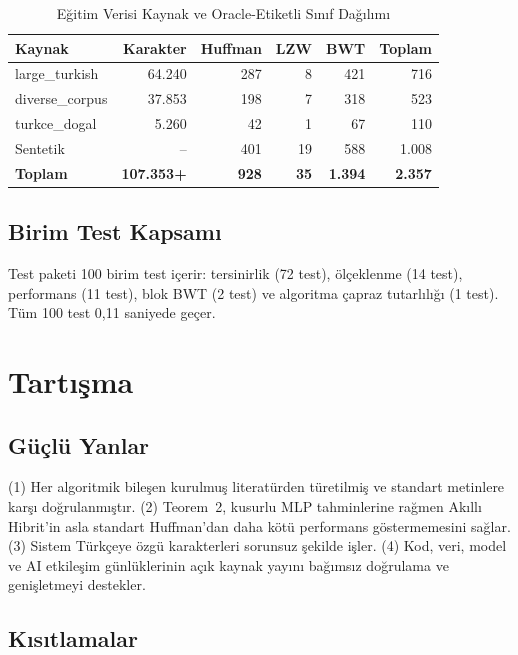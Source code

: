 \documentclass[conference]{IEEEtran}
\begin{document}
\begin{table}[h]
\caption{Eğitim Verisi Kaynak ve Oracle-Etiketli Sınıf Dağılımı}
\label{tab:dataset}
\centering
\small
\begin{tabular}{@{}lrrrrr@{}}
\toprule
Kaynak & Karakter & Huffman & LZW & BWT & Toplam \\
\midrule
large\_turkish & 64.240 & 287 & 8 & 421 & 716 \\
diverse\_corpus & 37.853 & 198 & 7 & 318 & 523 \\
turkce\_dogal & 5.260 & 42 & 1 & 67 & 110 \\
Sentetik & -- & 401 & 19 & 588 & 1.008 \\
\midrule
\textbf{Toplam} & \textbf{107.353+} & \textbf{928} & \textbf{35} & \textbf{1.394} & \textbf{2.357} \\
\bottomrule
\end{tabular}
\end{table}

\subsection{Birim Test Kapsamı}

Test paketi 100 birim test içerir: tersinirlik (72 test), ölçeklenme (14 test), performans (11 test), blok BWT (2 test) ve algoritma çapraz tutarlılığı (1 test). Tüm 100 test 0,11 saniyede geçer.

\section{Tartışma}

\subsection{Güçlü Yanlar}

(1) Her algoritmik bileşen kurulmuş literatürden türetilmiş ve standart metinlere karşı doğrulanmıştır. (2) Teorem~2, kusurlu MLP tahminlerine rağmen Akıllı Hibrit'in asla standart Huffman'dan daha kötü performans göstermemesini sağlar. (3) Sistem Türkçeye özgü karakterleri sorunsuz şekilde işler. (4) Kod, veri, model ve AI etkileşim günlüklerinin açık kaynak yayını bağımsız doğrulama ve genişletmeyi destekler.

\subsection{Kısıtlamalar}
\end{document}
